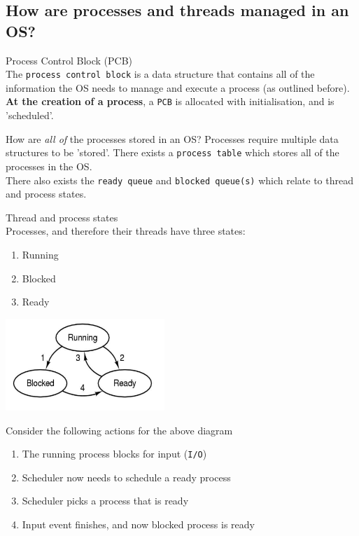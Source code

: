 \documentclass[journal, letterpaper]{IEEEtran}
\begin{document}
\subsection{How are processes and threads managed in an OS?}
\begin{theory}{Process Control Block (PCB)} \\
    The \verb|process control block| is a data structure that contains all of the information the OS needs to manage and execute a process (as outlined before).
    \newline \\ 
    \textbf{At the creation of a process}, a \verb|PCB| is allocated with initialisation, and is 'scheduled'.
\end{theory}
\begin{example}{How are \textit{all of} the processes stored in an OS?}
    Processes require multiple data structures to be 'stored'. There exists a \verb|process table| which stores all of the processes in the OS.
    \newline \\ 
    There also exists the \verb|ready queue| and \verb|blocked queue(s)| which relate to thread and process states.
\end{example}
\begin{theory}{Thread and process states} \\ 
    Processes, and therefore their threads have three states:
    \begin{enumerate}
        \item Running
        \item Blocked
        \item Ready
    \end{enumerate}
    \begin{center}
        \includegraphics[width=6cm]{./photos/thread_states.png}
    \end{center}
    Consider the following actions for the above diagram
    \begin{enumerate}
        \item The running process blocks for input (\verb|I/O|)
        \item Scheduler now needs to schedule a ready process
        \item Scheduler picks a process that is ready
        \item Input event finishes, and now blocked process is ready
    \end{enumerate}
\end{theory}
\end{document}
